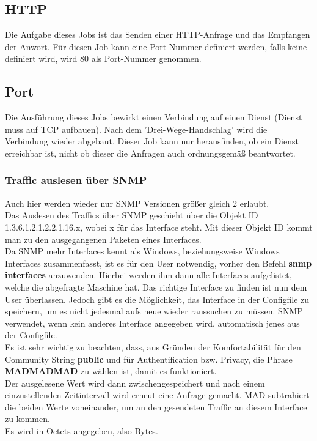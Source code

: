 \documentclass[12pt,a4paper]{report}
\begin{document}
\begin{onehalfspace}
\subsection{HTTP} Die Aufgabe dieses Jobs ist das Senden einer HTTP-Anfrage und das Empfangen der Anwort. Für diesen Job kann eine Port-Nummer definiert werden, falls keine definiert wird, wird 80 als Port-Nummer genommen.

\subsection{Port} Die Ausführung dieses Jobs bewirkt einen Verbindung auf einen Dienst (Dienst muss auf TCP aufbauen). Nach dem 'Drei-Wege-Handschlag' wird die Verbindung wieder abgebaut. Dieser Job kann nur herausfinden, ob ein Dienst erreichbar ist, nicht ob dieser die Anfragen auch ordnungsgemäß beantwortet.

\newpage
{}%

\subsubsection{Traffic auslesen über SNMP}
Auch hier werden wieder nur SNMP Versionen größer gleich 2 erlaubt.\\
Das Auslesen des Traffics über SNMP geschieht über die Objekt ID 1.3.6.1.2.1.2.2.1.16.x, wobei x für das Interface steht. Mit dieser Objekt ID kommt man zu den ausgegangenen Paketen eines Interfaces.\\
Da SNMP mehr Interfaces kennt als Windows, beziehungsweise Windows Interfaces zusammenfasst, ist es für den User notwendig, vorher den Befehl \textbf{snmp interfaces} anzuwenden. Hierbei werden ihm dann alle Interfaces aufgelistet, welche die abgefragte Maschine hat. Das richtige Interface zu finden ist nun dem User überlassen. Jedoch gibt es die Möglichkeit, das Interface in der Configfile zu speichern, um es nicht jedesmal aufs neue wieder raussuchen zu müssen. SNMP verwendet, wenn kein anderes Interface angegeben wird, automatisch jenes aus der Configfile.\\
Es ist sehr wichtig zu beachten, dass, aus Gründen der Komfortabilität für den Community String \textbf{public} und für Authentification bzw. Privacy, die Phrase \textbf{MADMADMAD} zu wählen ist, damit es funktioniert.\\

Der ausgelesene Wert wird dann zwischengespeichert und nach einem einzustellenden Zeitintervall wird erneut eine Anfrage gemacht. MAD subtrahiert die beiden Werte voneinander, um an den gesendeten Traffic an diesem Interface zu kommen.\\
Es wird in Octets angegeben, also Bytes.


\end{onehalfspace}
\end{document}
